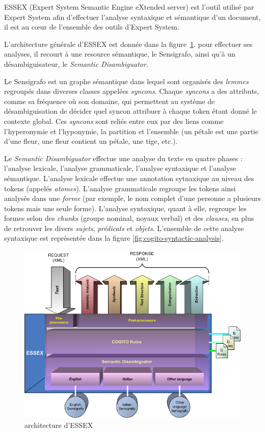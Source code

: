 \documentclass[PhD-Yoann-Dupont.tex]{subfiles}
\begin{document}
ESSEX (Expert System Semantic Engine eXtended server) est l'outil utilisé par Expert System afin d'effectuer l'analyse syntaxique et sémantique d'un document, il est au c\oe ur de l'ensemble des outils d'Expert System.

L'architecture générale d'ESSEX est donnée dans la figure\ \ref{fig:essex-architecture}. pour effectuer ses analyses, il recourt à une resource sémantique, le Sensigrafo, ainsi qu'à un désambiguisateur, le \emph{Semantic Disambiguator}.

Le Sensigrafo est un graphe sémantique dans lequel sont organisés des \emph{lemmes} regroupés dans diverses classes appelées \emph{syncons}. Chaque \emph{syncons} a des attributs, comme sa fréquence où son domaine, qui permettent au système de désambiguisation de décider quel syncon attribuer à chaque token étant donné le contexte global. Ces \emph{syncons} sont reliés entre eux par des liens comme l'hyperonymie et l'hyponymie, la partition et l'ensemble (un pétale est une partie d'une fleur, une fleur contient un pétale, une tige, etc.).

Le \emph{Semantic Disambiguator} effectue une analyse du texte en quatre phases : l'analyse lexicale, l'analyse grammaticale, l'analyse syntaxique et l'analyse sémantique. L'analyse lexicale effectue une annotation sytnaxique au niveau des tokens (appelés \emph{atomes}). L'analyse grammaticale regroupe les tokens ainsi analysés dans une \emph{forme} (par exemple, le nom complet d'une personne a plusieurs tokens mais une seule forme). L'analyse syntaxique, quant à elle, regroupe les formes selon des \emph{chunks} (groupe nominal, noyaux verbal) et des \emph{clauses}, en plus de retrouver les divers \emph{sujets}, \emph{prédicats} et \emph{objets}. L'ensemble de cette analyse syntaxique est représentée dans la figure \ref{fig:cogito-syntactic-analysis}.

\begin{figure}[ht!]
\centering
\includegraphics[scale=0.4]{images/ExpertSystem/ESSEX-Architecture}
\caption{architecture d'ESSEX}
\label{fig:essex-architecture}
\end{figure}
\end{document}
